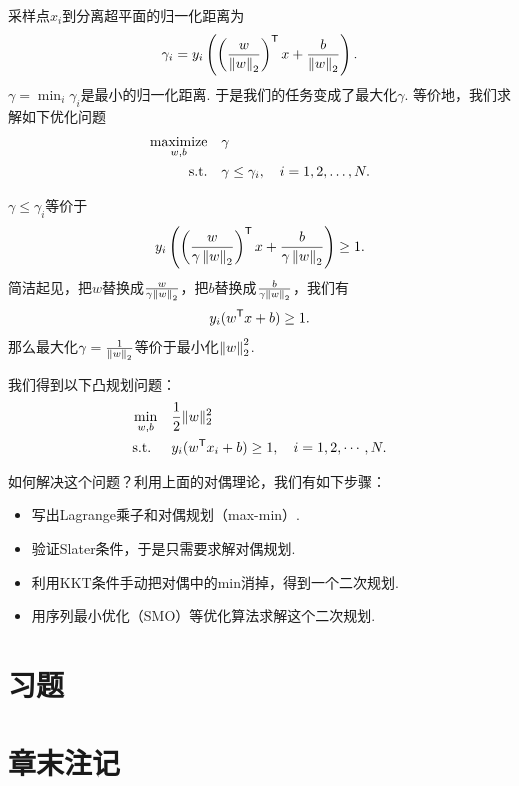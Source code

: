采样点$x_i$到分离超平面的归一化距离为
    $$\gamma_i=y_i\left(\left(\frac{w}{\left\|w\right\|_2}\right)^{\mathsf{T}} x+\frac{b}{\left\|w\right\|_2}\right).$$
$\gamma=\min_i\gamma_i$是最小的归一化距离. 于是我们的任务变成了最大化$\gamma$. 等价地，我们求解如下优化问题
\begin{align*}
    \operatorname*{maximize}_{w,b}\quad&\gamma \\
    \text{s.t.}\quad&\gamma\le\gamma_i,\quad i=1,2,\dots,N.
\end{align*}

$\gamma\le\gamma_i$等价于$$y_i\left(\left(\frac{w}{\gamma\left\|w\right\|_2}\right)^{\mathsf{T}} x+\frac{b}{\gamma\left\|w\right\|_2}\right)\geq 1.$$
简洁起见，把$w$替换成$\frac{w}{\gamma\left\|w\right\|_2}$，把$b$替换成$\frac{b}{\gamma\left\|w\right\|_2}$，我们有$$y_i(w^{\mathsf{T}} x+b)\geq 1.$$
那么最大化$\gamma=\frac{1}{\left\|w\right\|_2}$等价于最小化$\left\|w\right\|_2^2$. 

我们得到以下凸规划问题：
\begin{align*}
    \min_{w,b}\quad&\frac{1}{2}\|w\|_2^2\\
    \text{s.t. }\quad &y_i(w^{\mathsf{T}} x_i+b)\geq 1,\quad i=1,2,\cdots, N.
\end{align*}

如何解决这个问题？利用上面的对偶理论，我们有如下步骤：
\begin{itemize}
    \item 写出Lagrange乘子和对偶规划（max-min）.
    \item 验证Slater条件，于是只需要求解对偶规划.
    \item 利用KKT条件手动把对偶中的min消掉，得到一个二次规划.
    \item 用序列最小优化（SMO）等优化算法求解这个二次规划.
\end{itemize}

\section{习题}


\section{章末注记}

